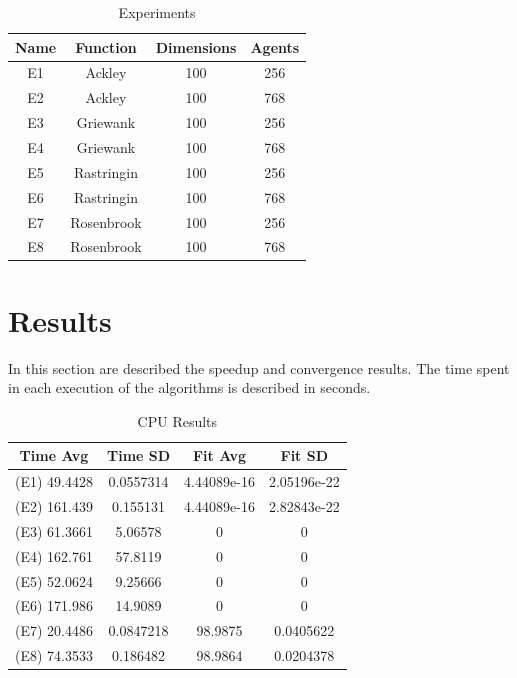 \documentclass[conference]{IEEEtran}
\begin{document}
\begin{table}[!htbp]
    \renewcommand{\arraystretch}{1.3}
    \caption{Experiments}
    \label{experiments}
    \centering
    \begin{tabular}{c|c|c|c}
    \hline
        \bf Name & Function &  Dimensions & Agents\\
    \hline
        E1 & Ackley & 100 & 256\\
        E2 & Ackley & 100 & 768\\
        E3 & Griewank & 100 & 256\\
        E4 & Griewank & 100 & 768\\
        E5 & Rastringin & 100 & 256\\
        E6 & Rastringin & 100 & 768\\
        E7 & Rosenbrook & 100 & 256\\
        E8 & Rosenbrook & 100 & 768\\
    \end{tabular}
\end{table}

\section{Results}

In this section are described the speedup and convergence results. The
time spent in each execution of the algorithms is described in seconds.

\begin{table}[!t]
    \renewcommand{\arraystretch}{1.3}
    \caption{CPU Results}
    \label{results}
    \centering
    \begin{tabular}{c|c|c|c}
    \hline
        Time Avg & Time SD & Fit Avg & Fit SD\\
    \hline
        (E1) 49.4428 & 0.0557314 & 4.44089e-16 & 2.05196e-22 \\
        (E2) 161.439 & 0.155131 & 4.44089e-16 & 2.82843e-22 \\
        (E3) 61.3661 & 5.06578   & 0  & 0 \\
        (E4) 162.761 & 57.8119 & 0 & 0 \\
        (E5) 52.0624 & 9.25666   & 0  & 0 \\
        (E6) 171.986 & 14.9089 & 0 & 0 \\
        (E7) 20.4486 & 0.0847218 & 98.9875 & 0.0405622 \\
        (E8) 74.3533 & 0.186482 & 98.9864 & 0.0204378 \\
    \end{tabular}
\end{table}
\end{document}
